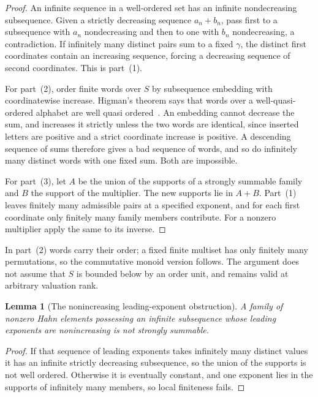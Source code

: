 \documentclass[11pt]{article}
\numberwithin{equation}{section}
\newtheorem{lemma}[theorem]{Lemma}
\theoremstyle{definition}
\theoremstyle{remark}
\begin{document}
\begin{proof}
An infinite sequence in a well-ordered set has an infinite nondecreasing
subsequence. Given a strictly decreasing sequence $a_n+b_n$, pass first to a
subsequence with $a_n$ nondecreasing and then to one with $b_n$ nondecreasing,
a contradiction. If infinitely many distinct pairs sum to a fixed $\gamma$,
the distinct first coordinates contain an increasing sequence, forcing a
decreasing sequence of second coordinates. This is part~(1).

For part~(2), order finite words over $S$ by subsequence embedding with
coordinatewise increase. Higman's theorem says that words over a
well-quasi-ordered alphabet are well quasi ordered~\cite{higman}. An embedding
cannot decrease the sum, and increases it strictly unless the two words are
identical, since inserted letters are positive and a strict coordinate
increase is positive. A descending sequence of sums therefore gives a bad
sequence of words, and so do infinitely many distinct words with one fixed
sum. Both are impossible.

For part~(3), let $A$ be the union of the supports of a strongly summable
family and $B$ the support of the multiplier. The new supports lie in $A+B$.
Part~(1) leaves finitely many admissible pairs at a specified exponent, and
for each first coordinate only finitely many family members contribute. For a
nonzero multiplier apply the same to its inverse.
\end{proof}

In part~(2) words carry their order; a fixed finite multiset has only finitely
many permutations, so the commutative monoid version follows. The argument
does not assume that $S$ is bounded below by an order unit, and remains valid
at arbitrary valuation rank.

\begin{lemma}[The nonincreasing leading-exponent obstruction]
\label{hol:lem:nonincreasing}
A family of nonzero Hahn elements possessing an infinite subsequence whose
leading exponents are \emph{nonincreasing} is not strongly summable.
\end{lemma}

\begin{proof}
If that sequence of leading exponents takes infinitely many distinct values it
has an infinite strictly decreasing subsequence, so the union of the supports
is not well ordered. Otherwise it is eventually constant, and one exponent
lies in the supports of infinitely many members, so local finiteness fails.
\end{proof}
\end{document}
